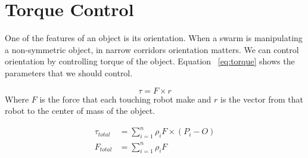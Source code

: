 \section{Torque Control}
\label{sec:theory}

One of the features of an object is its orientation. When a swarm is manipulating a non-symmetric object, in narrow corridors orientation matters. We can control orientation by controlling torque of the object. Equation ~\ref{eq:torque} shows the parameters that we should control.

\begin{equation}
\tau = F \times r\label{eq:torque}
\end{equation}
Where $F$ is the force that each touching robot make and $r$ is the vector from that robot to the center of mass of the object. 

\begin{align}
\tau_{total} &= \sum\limits_{i=1}^n \rho_i F \times (P_i - O)\\
F_{total} &= \sum\limits_{i=1}^n \rho_i F
\end{align}





